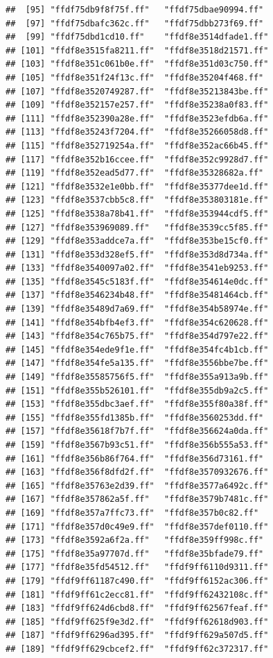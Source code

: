 \documentclass[
  12pt,
]{style/krantz}
\begin{document}
\begin{verbatim}
##  [95] "ffdf75db9f8f75f.ff"   "ffdf75dbae90994.ff"  
##  [97] "ffdf75dbafc362c.ff"   "ffdf75dbb273f69.ff"  
##  [99] "ffdf75dbd1cd10.ff"    "ffdf8e3514dfade1.ff" 
## [101] "ffdf8e3515fa8211.ff"  "ffdf8e3518d21571.ff" 
## [103] "ffdf8e351c061b0e.ff"  "ffdf8e351d03c750.ff" 
## [105] "ffdf8e351f24f13c.ff"  "ffdf8e35204f468.ff"  
## [107] "ffdf8e3520749287.ff"  "ffdf8e35213843be.ff" 
## [109] "ffdf8e352157e257.ff"  "ffdf8e35238a0f83.ff" 
## [111] "ffdf8e352390a28e.ff"  "ffdf8e3523efdb6a.ff" 
## [113] "ffdf8e35243f7204.ff"  "ffdf8e35266058d8.ff" 
## [115] "ffdf8e352719254a.ff"  "ffdf8e352ac66b45.ff" 
## [117] "ffdf8e352b16ccee.ff"  "ffdf8e352c9928d7.ff" 
## [119] "ffdf8e352ead5d77.ff"  "ffdf8e35328682a.ff"  
## [121] "ffdf8e3532e1e0bb.ff"  "ffdf8e35377dee1d.ff" 
## [123] "ffdf8e3537cbb5c8.ff"  "ffdf8e353803181e.ff" 
## [125] "ffdf8e3538a78b41.ff"  "ffdf8e353944cdf5.ff" 
## [127] "ffdf8e353969089.ff"   "ffdf8e3539cc5f85.ff" 
## [129] "ffdf8e353addce7a.ff"  "ffdf8e353be15cf0.ff" 
## [131] "ffdf8e353d328ef5.ff"  "ffdf8e353d8d734a.ff" 
## [133] "ffdf8e3540097a02.ff"  "ffdf8e3541eb9253.ff" 
## [135] "ffdf8e3545c5183f.ff"  "ffdf8e354614e0dc.ff" 
## [137] "ffdf8e3546234b48.ff"  "ffdf8e35481464cb.ff" 
## [139] "ffdf8e35489d7a69.ff"  "ffdf8e354b58974e.ff" 
## [141] "ffdf8e354bfb4ef3.ff"  "ffdf8e354c620628.ff" 
## [143] "ffdf8e354c765b75.ff"  "ffdf8e354d797e22.ff" 
## [145] "ffdf8e354ede9f1e.ff"  "ffdf8e354fc4b1cb.ff" 
## [147] "ffdf8e354fe5a135.ff"  "ffdf8e3556bbe7be.ff" 
## [149] "ffdf8e35585756f5.ff"  "ffdf8e355a913a9b.ff" 
## [151] "ffdf8e355b526101.ff"  "ffdf8e355db9a2c5.ff" 
## [153] "ffdf8e355dbc3aef.ff"  "ffdf8e355f80a38f.ff" 
## [155] "ffdf8e355fd1385b.ff"  "ffdf8e3560253dd.ff"  
## [157] "ffdf8e35618f7b7f.ff"  "ffdf8e356624a0da.ff" 
## [159] "ffdf8e3567b93c51.ff"  "ffdf8e356b555a53.ff" 
## [161] "ffdf8e356b86f764.ff"  "ffdf8e356d73161.ff"  
## [163] "ffdf8e356f8dfd2f.ff"  "ffdf8e3570932676.ff" 
## [165] "ffdf8e35763e2d39.ff"  "ffdf8e3577a6492c.ff" 
## [167] "ffdf8e357862a5f.ff"   "ffdf8e3579b7481c.ff" 
## [169] "ffdf8e357a7ffc73.ff"  "ffdf8e357b0c82.ff"   
## [171] "ffdf8e357d0c49e9.ff"  "ffdf8e357def0110.ff" 
## [173] "ffdf8e3592a6f2a.ff"   "ffdf8e359ff998c.ff"  
## [175] "ffdf8e35a97707d.ff"   "ffdf8e35bfade79.ff"  
## [177] "ffdf8e35fd54512.ff"   "ffdf9ff6110d9311.ff" 
## [179] "ffdf9ff61187c490.ff"  "ffdf9ff6152ac306.ff" 
## [181] "ffdf9ff61c2ecc81.ff"  "ffdf9ff62432108c.ff" 
## [183] "ffdf9ff624d6cbd8.ff"  "ffdf9ff62567feaf.ff" 
## [185] "ffdf9ff625f9e3d2.ff"  "ffdf9ff62618d903.ff" 
## [187] "ffdf9ff6296ad395.ff"  "ffdf9ff629a507d5.ff" 
## [189] "ffdf9ff629cbcef2.ff"  "ffdf9ff62c372317.ff" 

\end{verbatim}
\end{document}
